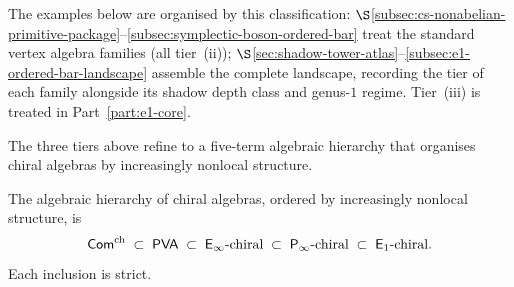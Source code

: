 \noindent
The examples below are organised by this classification:
$\S$\ref{subsec:cs-nonabelian-primitive-package}--\ref{subsec:symplectic-boson-ordered-bar}
treat the standard vertex algebra families (all tier~(ii));
$\S$\ref{sec:shadow-tower-atlas}--\ref{subsec:e1-ordered-bar-landscape}
assemble the complete landscape, recording the tier of each family
alongside its shadow depth class and genus-$1$ regime.
Tier~(iii) is treated in
Part~\ref{part:e1-core}\@.

The three tiers above refine to a five-term algebraic hierarchy
that organises chiral algebras by increasingly nonlocal structure.

\begin{definition}
\label{def:v2-algebraic-hierarchy}
The algebraic hierarchy of chiral algebras, ordered by increasingly
nonlocal structure, is
\begin{equation}\label{eq:five-term-hierarchy}
 \mathsf{Com}^{\mathrm{ch}}
 \;\subset\;
 \mathsf{PVA}
 \;\subset\;
 \mathsf{E}_{\infty}\text{-chiral}
 \;\subset\;
 \mathsf{P}_{\infty}\text{-chiral}
 \;\subset\;
 \mathsf{E}_1\text{-chiral}.
\end{equation}
Each inclusion is strict.
\end{definition}

